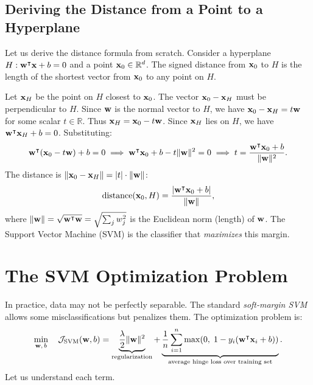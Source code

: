 \documentclass[11pt, letterpaper]{article}
\newcommand{\R}{\mathbb{R}}
\newcommand{\obj}{\mathcal{J}}
\begin{document}
\subsection{Deriving the Distance from a Point to a Hyperplane}

Let us derive the distance formula from scratch. Consider a hyperplane $H: \vb{w}^{\intercal}\vb{x} + b = 0$ and a point $\vb{x}_0 \in \R^d$. The signed distance from $\vb{x}_0$ to $H$ is the length of the shortest vector from $\vb{x}_0$ to any point on $H$.

Let $\vb{x}_H$ be the point on $H$ closest to $\vb{x}_0$. The vector $\vb{x}_0 - \vb{x}_H$ must be perpendicular to $H$. Since $\vb{w}$ is the normal vector to $H$, we have $\vb{x}_0 - \vb{x}_H = t \vb{w}$ for some scalar $t \in \R$. Thus $\vb{x}_H = \vb{x}_0 - t\vb{w}$. Since $\vb{x}_H$ lies on $H$, we have $\vb{w}^{\intercal}\vb{x}_H + b = 0$. Substituting:
\begin{equation}
    \vb{w}^{\intercal}(\vb{x}_0 - t\vb{w}) + b = 0 \implies \vb{w}^{\intercal}\vb{x}_0 + b - t\|\vb{w}\|^2 = 0 \implies t = \frac{\vb{w}^{\intercal}\vb{x}_0 + b}{\|\vb{w}\|^2}.
\end{equation}
The distance is $\|\vb{x}_0 - \vb{x}_H\| = |t| \cdot \|\vb{w}\|$:
\begin{equation}
    \text{distance}(\vb{x}_0, H) = \frac{|\vb{w}^{\intercal}\vb{x}_0 + b|}{\|\vb{w}\|},
\end{equation}
where $\|\vb{w}\| = \sqrt{\vb{w}^{\intercal}\vb{w}} = \sqrt{\sum_j w_j^2}$ is the Euclidean norm (length) of $\vb{w}$. The Support Vector Machine (SVM) is the classifier that \emph{maximizes} this margin.

\section{The SVM Optimization Problem}\label{sec:svm_opt}

In practice, data may not be perfectly separable. The standard \emph{soft-margin SVM} allows some misclassifications but penalizes them. The optimization problem is:
\begin{equation}\label{eq:svm_objective}
    \min_{\vb{w},\, b}\quad \obj_{\text{SVM}}(\vb{w}, b) = \underbrace{\frac{\lambda}{2}\|\vb{w}\|^2}_{\text{regularization}} + \underbrace{\frac{1}{n}\sum_{i=1}^{n} \max\!\left(0,\; 1 - y_i\!\left(\vb{w}^{\intercal} \vb{x}_i + b\right)\right)}_{\text{average hinge loss over training set}}.
\end{equation}
Let us understand each term.
\end{document}
